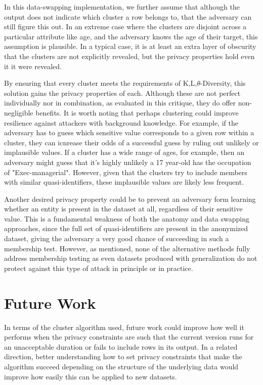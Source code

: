 In this data-swapping implementation, we further assume that although the output does not indicate which cluster a row belongs to, that the adversary can still figure this out. In an extreme case where the clusters are disjoint across a particular attribute like age, and the adversary knows the age of their target, this assumption is plausible. In a typical case, it is at least an extra layer of obscurity that the clusters are not explicitly revealed, but the privacy properties hold even it it were revealed.

By ensuring that every cluster meets the requirements of K,L,$\theta$-Diversity, this solution gains the privacy properties of each. Although these are not perfect individually nor in combination, as evaluated in this critique\cite{domingoCritique}, they do offer non-negligible benefits. It is worth noting that perhaps clustering could improve resilience against attackers with background knowledge. For example, if the adversary has to guess which sensitive value corresponds to a given row within a cluster, they can icnrease their odds of a successful guess by ruling out unlikely or implausible values. If a cluster has a wide range of ages, for example, then an adversary might guess that it's highly unlikely a 17 year-old has the occupation of "Exec-managerial". However, given that the clusters try to include members with similar quasi-identifiers, these implausible values are likely less frequent.

Another desired privacy property could be to prevent an adversary form learning whether an entity is present in the dataset at all, regardless of their sensitive value. This is a fundamental weakness of both the anatomy and data swapping approaches, since the full set of quasi-identifiers are present in the anonymized dataset, giving the adversary a very good chance of succeeding in such a membership test. However, as mentioned, none of the alternative methods fully address membership testing as even datasets produced with generalization do not protect against this type of attack in principle or in practice.

\section{Future Work}
In terms of the cluster algorithm used, future work could improve how well it performs when the privacy constraints are such that the current version runs for an unacceptable duration or fails to include rows in its output. In a related direction, better understanding how to set privacy constraints that make the algorithm succeed depending on the structure of the underlying data would improve how easily this can be applied to new datasets.

